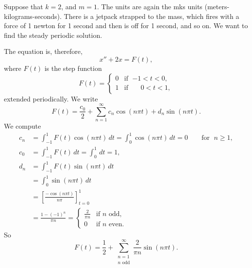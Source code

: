 \begin{example} \label{afs:steadyex}
Suppose that $k=2$, and $m=1$.
The units are again the mks units
(meters-kilograms-seconds).
There is a jetpack strapped to the mass, which fires with a force of 1
newton for 1
second and then is off for 1 second, and so on.  We want to find the steady periodic
solution.

The equation is, therefore,
\begin{equation*}
x'' + 2 x = F(t) ,
\end{equation*}
where $F(t)$ is the step function
\begin{equation*}
F(t) =
\begin{cases}
0 & \text{if } \; {-1} < t < 0 , \\
1 & \text{if } \; \phantom{-}0 < t < 1 ,
\end{cases}
\end{equation*}
extended periodically.
We write
\begin{equation*}
F(t) = \frac{c_0}{2} + \sum_{n=1}^\infty
c_n \cos (n \pi t) +
d_n \sin (n \pi t) .
\end{equation*}
We compute
\begin{align*}
c_n & = \int_{-1}^1 F(t) \cos (n \pi t) \, dt = 
\int_{0}^1 \cos (n \pi t) \, dt = 0 \qquad \text{for } \; n \geq 1,
\\
c_0 & = \int_{-1}^1 F(t) \, dt = 
\int_{0}^1 \, dt = 1 ,
\\
d_n & = \int_{-1}^1 F(t) \sin (n \pi t) \, dt
\\
& = \int_{0}^1 \sin (n \pi t) \, dt
\\
& = \left[ \frac{-\cos (n \pi t)}{n \pi} \right]_{t=0}^1
\\
& = \frac{1-{(-1)}^n}{\pi n} =
\begin{cases}
\frac{2}{\pi n} & \text{if } n \text{ odd} , \\
0 & \text{if } n \text{ even} .
\end{cases}
\end{align*}
So
\begin{equation*}
F(t) = \frac{1}{2} + \sum_{\substack{n=1 \\ n \text{ odd}}}^\infty
\frac{2}{\pi n} \sin (n \pi t) .
\end{equation*}


\end{example}
